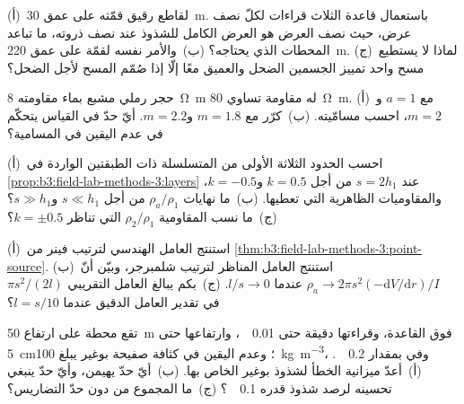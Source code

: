 \begin{exercise}[$\star\star$]\label{exo:b3:field-lab-methods-3:7}
(أ)~لقاطع رقيق قمّته على عمق \qty{30}{m}. باستعمال قاعدة الثلاث
قراءات لكلّ نصف عرض، حيث نصف العرض هو العرض الكامل للشذوذ عند نصف
ذروته، ما تباعد المحطات الذي يحتاجه؟ (ب)~والأمر نفسه
لقمّة على عمق \qty{220}{m}. (ج)~لماذا لا يستطيع مسح واحد
تمييز الجسمين الضحل والعميق معًا إلّا إذا صُمّم المسح لأجل
الضحل؟
\end{exercise}

\begin{exercise}[$\star\star$]\label{exo:b3:field-lab-methods-3:8}
حجر رملي مشبع بماء مقاومته \qty{8}{\ohm\metre} له مقاومة
تساوي \qty{80}{\ohm\metre}. (أ)~مع $a = 1$ و$m = 2$،
احسب مسامّيته. (ب)~كرّر مع $m = 1.8$ و$m = 2.2$. أيّ
حدّ في القياس يتحكّم في عدم اليقين في المسامية؟
\end{exercise}

\begin{exercise}[$\star\star$]\label{exo:b3:field-lab-methods-3:9}
  (أ)~احسب الحدود الثلاثة الأولى من المتسلسلة ذات الطبقتين
الواردة في \cref{prop:b3:field-lab-methods-3:layers} عند $s = 2h_1$ من أجل $k =
\num{0.5}$ و$k = \num{-0.5}$، والمقاوميات الظاهرية التي
تعطيها. (ب)~ما نهايات $\rho_a/\rho_1$ من أجل $s \ll h_1$
و$s \gg h_1$؟ (ج)~ما نسب المقاومية $\rho_2/\rho_1$ التي تناظر
$k = \pm 0.5$؟
\end{exercise}

\begin{exercise}[$\star\star\star$]\label{exo:b3:field-lab-methods-3:10}
  (أ)~استنتج العامل الهندسي لترتيب فينر من
\cref{thm:b3:field-lab-methods-3:point-source}. (ب)~استنتج العامل المناظر لترتيب
شلمبرجر، وبيّن أنّ $\rho_a \to 2\pi s^2(-\mathrm{d}V/
\mathrm{d}r)/I$ عندما $l/s \to 0$. (ج)~بكم يبالغ العامل التقريبي
$\pi s^2/(2l)$ في تقدير العامل الدقيق عندما $l = s/10$؟
\end{exercise}

\begin{exercise}[$\star\star\star$]\label{exo:b3:field-lab-methods-3:11}
تقع محطة على ارتفاع \qty{50}{m} فوق القاعدة، وقراءتها دقيقة حتى
\qty{0.01}{\milli\gal}، وارتفاعها حتى \qty{5}{cm}؛ وعدم اليقين في كثافة صفيحة بوغير يبلغ
\qty{100}{kg.m^{-3}}، وفي  بمقدار
\qty{0.2}{\milli\gal}. (أ)~أعدّ ميزانية الخطأ لشذوذ بوغير الخاص بها.
(ب)~أيّ حدّ يهيمن، وأيّ حدّ ينبغي تحسينه لرصد شذوذ
قدره \qty{0.1}{\milli\gal}؟ (ج)~ما المجموع من دون
حدّ التضاريس؟
\end{exercise}

